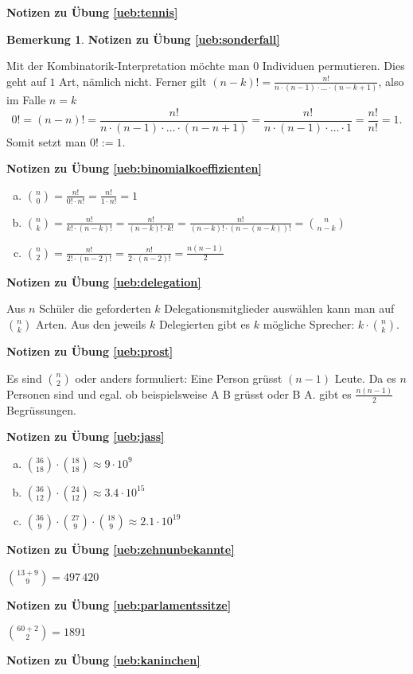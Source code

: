 \documentclass[%
<<<<<<< Updated upstream
11pt,%
twoside,%
titlepage,%
german,%
=======
11pt,%
twoside,%
titlepage,%
swissgerman,%
>>>>>>> Stashed changes
headsepline%
]{scrartcl}
\newcommand{\faReturnGray}{\textcolor{gray}{\faMailReply}} %
\theoremstyle{definition}
\newtheorem{bem}{Bemerkung}[subsection] %
\theoremstyle{plain}
\newcommand{\concatueb}[1]{ueb:#1}%
\newcommand{\concatlsg}[1]{lsg:#1}%
\newenvironment{lsg}[1]{%
    \par\noindent\textbf{Notizen zu Übung \ref{\concatueb{#1}}}\label{\concatlsg{#1}}
    \hfill\hyperref[\concatueb{#1}]{\faReturnGray}\par %
}{%
    \par%
}
\newcounter{theo}[section]\setcounter{theo}{0}
\newcommand{\concatueb}[1]{ueb:#1}%
\newcommand{\concatlsg}[1]{lsg:#1}%
\newenvironment{lsg}[1]{%
    \par\noindent\textbf{Notizen zu Übung \ref{\concatueb{#1}}.}%
    \label{\concatlsg{#1}}
}{%
    \par%
}
\begin{document}
\begin{lsg}{tennis}
\begin{bem}
\begin{lsg}{sonderfall}
Mit der Kombinatorik-Interpretation m\"ochte man $0$ Individuen permutieren. Dies geht auf $1$ Art, n\"amlich nicht. Ferner gilt $(n-k)!=\frac{n!}{n\cdot(n-1)\cdot\dots\cdot(n-k+1)}$, also im Falle $n=k$
$$0!=(n-n)!=\frac{n!}{n\cdot(n-1)\cdot\dots\cdot(n-n+1)}=\frac{n!}{n\cdot(n-1)\cdot\dots\cdot1}=\frac{n!}{n!}=1.$$
Somit setzt man $0!:=1$.
\end{lsg}
\begin{lsg}{binomialkoeffizienten}
\begin{enumerate}[a)]
\item $\binom{n}{0}=\frac{n!}{0!\cdot n!}=\frac{n!}{1\cdot n!}=1$
\item $\binom{n}{k}=\frac{n!}{k!\cdot (n-k)!}=\frac{n!}{(n-k)!\cdot k!}=\frac{n!}{(n-k)!\cdot (n-(n-k))!}=\binom{n}{n-k}$
\item $\binom{n}{2}=\frac{n!}{2!\cdot(n-2)!}=\frac{n!}{2\cdot(n-2)!}=\frac{n(n-1)}{2}$
\end{enumerate}
\end{lsg}
\begin{lsg}{delegation}
Aus $n$ Schüler die geforderten $k$ Delegationsmitglieder ausw\"ahlen kann man auf $\binom{n}{k}$ Arten. Aus den jeweils $k$ Delegierten gibt es $k$ m\"ogliche Sprecher: $k\cdot\binom{n}{k}$.
\end{lsg}
\begin{lsg}{prost}
Es sind $\binom{n}{2}$ oder anders formuliert: Eine Person gr\"usst $(n-1)$ Leute. Da es $n$ Personen sind und egal. ob beispielsweise A B gr\"usst oder B A. gibt es $\frac{n(n-1)}{2}$ Begr\"ussungen.
\end{lsg}
\begin{lsg}{jass}
\begin{enumerate}[a)]
\item $\binom{36}{18}\cdot\binom{18}{18}\approx9\cdot10^{9}$
\item $\binom{36}{12}\cdot\binom{24}{12}\approx3.4\cdot10^{15}$
\item $\binom{36}{9}\cdot\binom{27}{9}\cdot\binom{18}{9}\approx2.1\cdot10^{19}$
\end{enumerate}
\end{lsg}
\begin{lsg}{zehnunbekannte}
$\binom{13+9}{9}=497\,420$
\end{lsg}
\begin{lsg}{parlamentssitze}
$\binom{60+2}{2}=1891$
\end{lsg}
\begin{lsg}{kaninchen}
\begin{enumerate}[a)]

\end{enumerate}
\end{lsg}
\end{bem}
\end{lsg}
\end{document}

